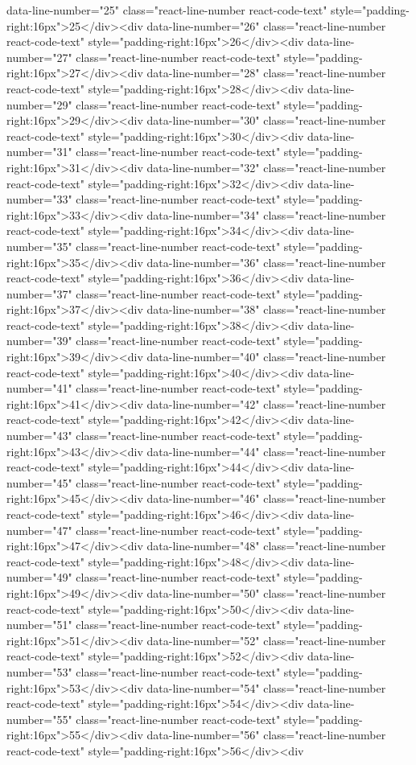 data-line-number="25" class="react-line-number react-code-text" style="padding-right:16px">25</div><div data-line-number="26" class="react-line-number react-code-text" style="padding-right:16px">26</div><div data-line-number="27" class="react-line-number react-code-text" style="padding-right:16px">27</div><div data-line-number="28" class="react-line-number react-code-text" style="padding-right:16px">28</div><div data-line-number="29" class="react-line-number react-code-text" style="padding-right:16px">29</div><div data-line-number="30" class="react-line-number react-code-text" style="padding-right:16px">30</div><div data-line-number="31" class="react-line-number react-code-text" style="padding-right:16px">31</div><div data-line-number="32" class="react-line-number react-code-text" style="padding-right:16px">32</div><div data-line-number="33" class="react-line-number react-code-text" style="padding-right:16px">33</div><div data-line-number="34" class="react-line-number react-code-text" style="padding-right:16px">34</div><div data-line-number="35" class="react-line-number react-code-text" style="padding-right:16px">35</div><div data-line-number="36" class="react-line-number react-code-text" style="padding-right:16px">36</div><div data-line-number="37" class="react-line-number react-code-text" style="padding-right:16px">37</div><div data-line-number="38" class="react-line-number react-code-text" style="padding-right:16px">38</div><div data-line-number="39" class="react-line-number react-code-text" style="padding-right:16px">39</div><div data-line-number="40" class="react-line-number react-code-text" style="padding-right:16px">40</div><div data-line-number="41" class="react-line-number react-code-text" style="padding-right:16px">41</div><div data-line-number="42" class="react-line-number react-code-text" style="padding-right:16px">42</div><div data-line-number="43" class="react-line-number react-code-text" style="padding-right:16px">43</div><div data-line-number="44" class="react-line-number react-code-text" style="padding-right:16px">44</div><div data-line-number="45" class="react-line-number react-code-text" style="padding-right:16px">45</div><div data-line-number="46" class="react-line-number react-code-text" style="padding-right:16px">46</div><div data-line-number="47" class="react-line-number react-code-text" style="padding-right:16px">47</div><div data-line-number="48" class="react-line-number react-code-text" style="padding-right:16px">48</div><div data-line-number="49" class="react-line-number react-code-text" style="padding-right:16px">49</div><div data-line-number="50" class="react-line-number react-code-text" style="padding-right:16px">50</div><div data-line-number="51" class="react-line-number react-code-text" style="padding-right:16px">51</div><div data-line-number="52" class="react-line-number react-code-text" style="padding-right:16px">52</div><div data-line-number="53" class="react-line-number react-code-text" style="padding-right:16px">53</div><div data-line-number="54" class="react-line-number react-code-text" style="padding-right:16px">54</div><div data-line-number="55" class="react-line-number react-code-text" style="padding-right:16px">55</div><div data-line-number="56" class="react-line-number react-code-text" style="padding-right:16px">56</div><div 